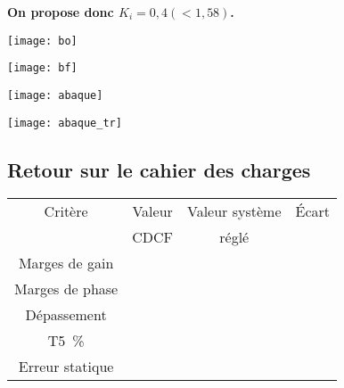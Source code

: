 \begin{multicols}{2}
\begin{corrige}
\textbf{On propose donc $K_i=0,4 (<1,58)$.}
\end{corrige}
\else
\fi



\ifprof
\else

\begin{center}
\texttt{[image: bo]}
\end{center}

\begin{center}
\texttt{[image: bf]}
\end{center}

\begin{center}
\texttt{[image: abaque]}
\end{center}

\begin{center}
\texttt{[image: abaque\_tr]}
\end{center}

\fi

\subsection*{Retour sur le cahier des charges}

\ifprof
\else
\footnotesize
\begin{center}
\begin{tabular}{|c|c|c|c|}
\hline
Critère & Valeur & Valeur système & Écart \\ 
 &  CDCF & réglé &  \\ \hline
Marges de gain &  &&\\ \hline
Marges de phase &  &&\\ \hline
Dépassement &  &&\\ \hline
T5~\% & && \\ \hline
Erreur statique &&& \\ \hline
\end{tabular}
\end{center}
\normalsize 
\fi

\ifprof

\begin{corrige}~\\


\end{corrige}
\end{multicols}
